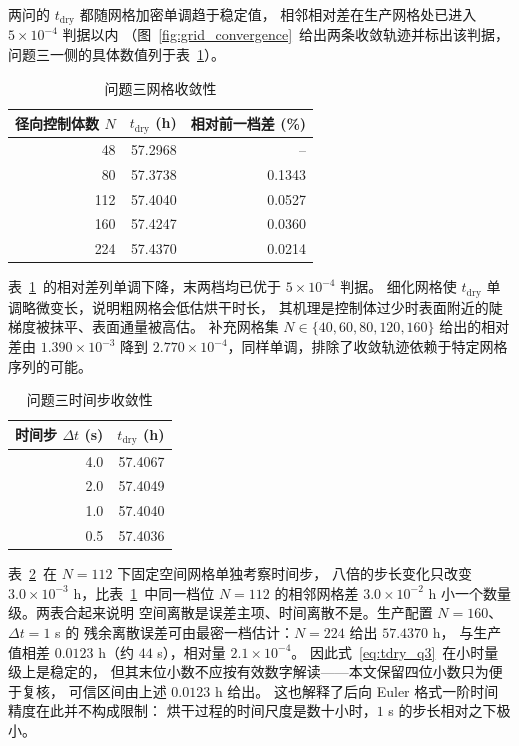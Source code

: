两问的 $t_{\mathrm{dry}}$ 都随网格加密单调趋于稳定值，
相邻相对差在生产网格处已进入 $5\times10^{-4}$ 判据以内
（图~\ref{fig:grid_convergence}~给出两条收敛轨迹并标出该判据，
问题三一侧的具体数值列于表~\ref{tab:grid}）。

\begin{table}[H]
  \centering
  \caption{问题三网格收敛性}
  \label{tab:grid}
  \begin{tabular}{rrr}
  \toprule
  径向控制体数 $N$ & $t_{\mathrm{dry}}$ (h) & 相对前一档差 (\%) \\
  \midrule
  48  & 57.2968 & --     \\
  80  & 57.3738 & 0.1343 \\
  112 & 57.4040 & 0.0527 \\
  160 & 57.4247 & 0.0360 \\
  224 & 57.4370 & 0.0214 \\
  \bottomrule
  \end{tabular}
\end{table}

表~\ref{tab:grid}~的相对差列单调下降，末两档均已优于 $5\times10^{-4}$ 判据。
细化网格使 $t_{\mathrm{dry}}$ 单调略微变长，说明粗网格会低估烘干时长，
其机理是控制体过少时表面附近的陡梯度被抹平、表面通量被高估。
补充网格集 $N\in\{40,60,80,120,160\}$ 给出的相对差由 $1.390\times10^{-3}$
降到 $2.770\times10^{-4}$，同样单调，排除了收敛轨迹依赖于特定网格序列的可能。

\begin{table}[H]
  \centering
  \caption{问题三时间步收敛性}
  \label{tab:dt}
  \begin{tabular}{rr}
  \toprule
  时间步 $\Delta t$ (s) & $t_{\mathrm{dry}}$ (h) \\
  \midrule
  4.0 & 57.4067 \\
  2.0 & 57.4049 \\
  1.0 & 57.4040 \\
  0.5 & 57.4036 \\
  \bottomrule
  \end{tabular}
\end{table}

表~\ref{tab:dt}~在 $N=112$ 下固定空间网格单独考察时间步，
八倍的步长变化只改变 $3.0\times10^{-3}$ h，比表~\ref{tab:grid}~中同一档位
$N=112$ 的相邻网格差 $3.0\times10^{-2}$ h 小一个数量级。两表合起来说明
空间离散是误差主项、时间离散不是。生产配置 $N=160$、$\Delta t=1$ s 的
残余离散误差可由最密一档估计：$N=224$ 给出 $57.4370$ h，
与生产值相差 $0.0123$ h（约 $44$ s），相对量 $2.1\times10^{-4}$。
因此式~\eqref{eq:tdry_q3}~在小时量级上是稳定的，
但其末位小数不应按有效数字解读——本文保留四位小数只为便于复核，
可信区间由上述 $0.0123$ h 给出。
这也解释了后向 Euler 格式一阶时间精度在此并不构成限制：
烘干过程的时间尺度是数十小时，$1$ s 的步长相对之下极小。
\fi
